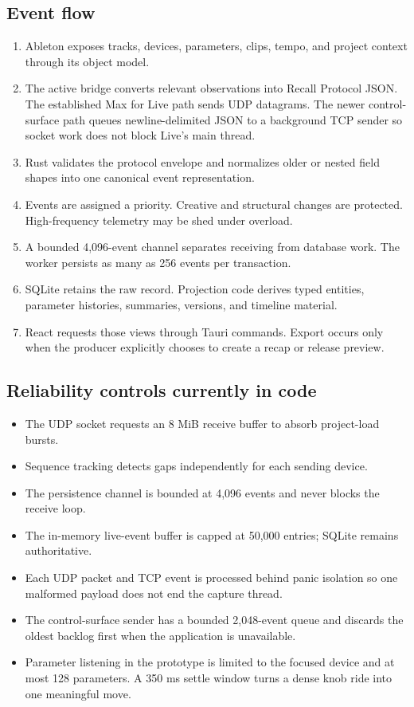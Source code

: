 \documentclass[11pt,letterpaper]{article}
\begin{document}
\subsection{Event flow}

\begin{enumerate}
  \item Ableton exposes tracks, devices, parameters, clips, tempo, and project context
        through its object model.
  \item The active bridge converts relevant observations into Recall Protocol JSON.
        The established Max for Live path sends UDP datagrams. The newer control-surface
        path queues newline-delimited JSON to a background TCP sender so socket work does
        not block Live's main thread.
  \item Rust validates the protocol envelope and normalizes older or nested field shapes
        into one canonical event representation.
  \item Events are assigned a priority. Creative and structural changes are protected.
        High-frequency telemetry may be shed under overload.
  \item A bounded 4,096-event channel separates receiving from database work. The worker
        persists as many as 256 events per transaction.
  \item SQLite retains the raw record. Projection code derives typed entities, parameter
        histories, summaries, versions, and timeline material.
  \item React requests those views through Tauri commands. Export occurs only when the
        producer explicitly chooses to create a recap or release preview.
\end{enumerate}

\subsection{Reliability controls currently in code}

\begin{itemize}
  \item The UDP socket requests an 8 MiB receive buffer to absorb project-load bursts.
  \item Sequence tracking detects gaps independently for each sending device.
  \item The persistence channel is bounded at 4,096 events and never blocks the receive loop.
  \item The in-memory live-event buffer is capped at 50,000 entries; SQLite remains authoritative.
  \item Each UDP packet and TCP event is processed behind panic isolation so one malformed
        payload does not end the capture thread.
  \item The control-surface sender has a bounded 2,048-event queue and discards the oldest
        backlog first when the application is unavailable.
  \item Parameter listening in the prototype is limited to the focused device and at most
        128 parameters. A 350 ms settle window turns a dense knob ride into one meaningful move.
\end{itemize}
\end{document}
